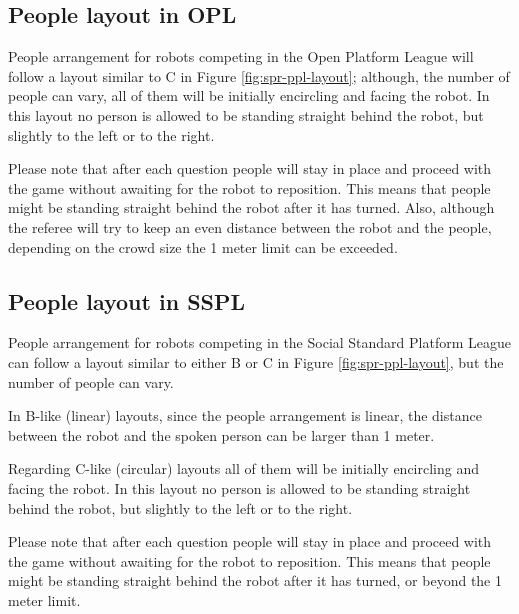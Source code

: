 \subsection{People layout in OPL}
People arrangement for robots competing in the Open Platform League will follow a layout similar to C in Figure \ref{fig:spr-ppl-layout}; although, the number of people can vary, all of them will be initially encircling and facing the robot. In this layout no person is allowed to be standing straight behind the robot, but slightly to the left or to the right.

Please note that after each question people will stay in place and proceed with the game without awaiting for the robot to reposition. This means that people might be standing straight behind the robot after it has turned. Also, although the referee will try to keep an even distance between the robot and the people, depending on the crowd size the 1 meter limit can be exceeded.

\subsection{People layout in SSPL}
People arrangement for robots competing in the Social Standard Platform League can follow a layout similar to either B or C in Figure \ref{fig:spr-ppl-layout}, but the number of people can vary.

In B-like (linear) layouts, since the people arrangement is linear, the distance between the robot and the spoken person can be larger than 1 meter.

Regarding C-like (circular) layouts all of them will be initially encircling and facing the robot. In this layout no person is allowed to be standing straight behind the robot, but slightly to the left or to the right.

Please note that after each question people will stay in place and proceed with the game without awaiting for the robot to reposition. This means that people might be standing straight behind the robot after it has turned, or beyond the 1 meter limit.